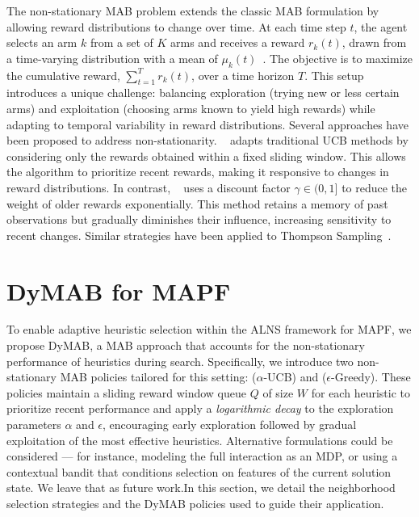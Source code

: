 \documentclass[review]{jair}
\begin{document}
The non-stationary MAB problem extends the classic MAB formulation by allowing reward distributions to change over time. At each time step \(t\), the agent selects an arm \(k\) from a set of \(K\) arms and receives a reward \(r_k(t)\), drawn from a time-varying distribution with a mean of \(\mu_k(t)\)~\citep{MAB1, Non-Stationary1}. The objective is to maximize the cumulative reward, \(\sum_{t=1}^{T} r_k(t)\), over a time horizon \(T\). This setup introduces a unique challenge: balancing exploration (trying new or less certain arms) and exploitation (choosing arms known to yield high rewards) while adapting to temporal variability in reward distributions.
Several approaches have been proposed to address non-stationarity. ~\citep{Non-Stationary} adapts traditional UCB methods by considering only the rewards obtained within a fixed sliding window. This allows the algorithm to prioritize recent rewards, making it responsive to changes in reward distributions. In contrast, ~\citep{Non-Stationary2} uses a discount factor \(\gamma \in (0,1]\) to reduce the weight of older rewards exponentially. This method retains a memory of past observations but gradually diminishes their influence, increasing sensitivity to recent changes. Similar strategies have been applied to Thompson Sampling~\citep{windowed-thompson, discounted-thompson}.  

\section{DyMAB for MAPF} \label{sec:dymab}
To enable adaptive heuristic selection within the ALNS framework for MAPF, we propose DyMAB, a MAB approach that accounts for the non-stationary performance of heuristics during search. Specifically, we introduce two non-stationary MAB policies tailored for this setting: ($\alpha$-UCB) and ($\epsilon$-Greedy). These policies maintain a sliding reward window queue $Q$ of size \(W\) for each heuristic to prioritize recent performance and apply a \emph{logarithmic decay} to the exploration parameters \(\alpha\) and \(\epsilon\), encouraging early exploration followed by gradual exploitation of the most effective heuristics. Alternative formulations could be considered — for instance, modeling the full interaction as an MDP, or using a contextual bandit that conditions selection on features of the current solution state. We leave that as future work.In this section, we detail the neighborhood selection strategies and the DyMAB policies used to guide their application.
\end{document}
